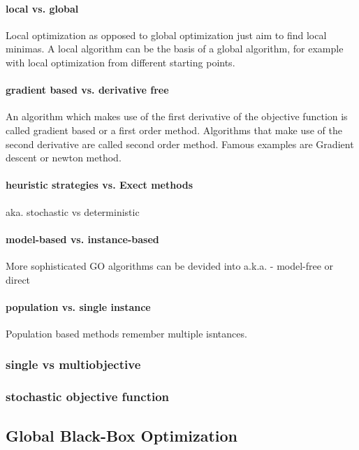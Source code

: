 \documentclass[english]{article}
\begin{document}
\paragraph{local vs. global} Local optimization as opposed to global optimization just aim to find local minimas. A local algorithm can be the basis of a global algorithm, for example with local optimization from different starting points.

\paragraph{gradient based vs. derivative free}
An algorithm which makes use of the first derivative of the objective function is called gradient based or a first order method. Algorithms that make use of the second derivative are called second order method. Famous examples are Gradient descent or newton method.

\paragraph{heuristic strategies vs. Exect methods}
aka. stochastic vs deterministic

\paragraph{model-based vs. instance-based}
More sophisticated \ac{GO} algorithms can be devided into
a.k.a. - model-free or direct

\paragraph{population vs. single instance}
Population based methods remember multiple isntances.

\subsubsection*{single vs multiobjective}


\subsubsection*{stochastic objective function}

\subsection{Global Black-Box Optimization}
\end{document}
